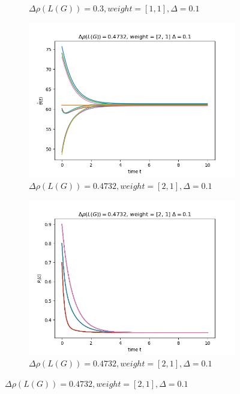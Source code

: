\documentclass{article}
\begin{document}
\begin{problem}
\begin{figure}[!h]
\begin{subfigure}{0.4\textwidth}
            \caption{$\Delta \rho (L(G)) = 0.3, weight = [1,1], \Delta = 0.1$}
        \end{subfigure}
        \begin{subfigure}{0.4\textwidth}
            \includegraphics[width=\textwidth]{./img/Figure_2.png}
            \caption{$\Delta \rho (L(G)) = 0.4732, weight = [2,1], \Delta = 0.1$}
        \end{subfigure}
        \begin{subfigure}{0.4\textwidth}
            \includegraphics[width=\textwidth]{./img/Figure_3.png}
            \caption{$\Delta \rho (L(G)) = 0.4732, weight = [2,1], \Delta = 0.1$}
        \end{subfigure}
    \end{figure}

\end{problem}
\end{document}
